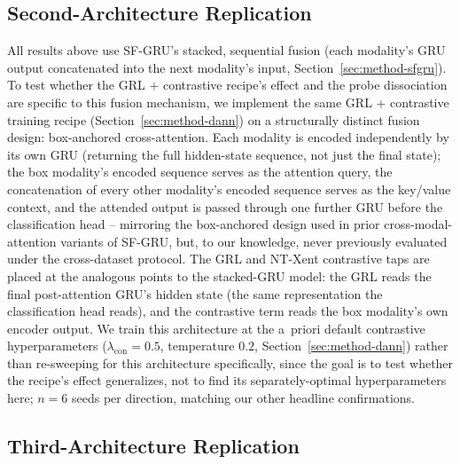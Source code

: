 \subsection{Second-Architecture Replication}
\label{sec:method-crossattn}

All results above use SF-GRU's stacked, sequential fusion (each
modality's GRU output concatenated into the next modality's input,
Section~\ref{sec:method-sfgru}). To test whether the GRL + contrastive
recipe's effect and the probe dissociation are specific to this fusion
mechanism, we implement the same GRL + contrastive training recipe
(Section~\ref{sec:method-dann}) on a structurally distinct fusion
design: box-anchored cross-attention. Each modality is encoded
independently by its own GRU (returning the full hidden-state
sequence, not just the final state); the box modality's encoded
sequence serves as the attention query, the concatenation of every
other modality's encoded sequence serves as the key/value context, and
the attended output is passed through one further GRU before the
classification head -- mirroring the box-anchored design used in
prior cross-modal-attention variants of SF-GRU, but, to our knowledge,
never previously evaluated under the cross-dataset protocol. The GRL
and NT-Xent contrastive taps are placed at the analogous points to
the stacked-GRU model: the GRL reads the final post-attention GRU's
hidden state (the same representation the classification head reads),
and the contrastive term reads the box modality's own encoder output.
We train this architecture at the a~priori default contrastive
hyperparameters ($\lambda_{\text{con}}=0.5$, temperature $0.2$,
Section~\ref{sec:method-dann}) rather than re-sweeping for this
architecture specifically, since the goal is to test whether the
recipe's effect generalizes, not to find its separately-optimal
hyperparameters here; $n=6$ seeds per direction, matching our other
headline confirmations.

\subsection{Third-Architecture Replication}
\label{sec:method-uncertainty}

